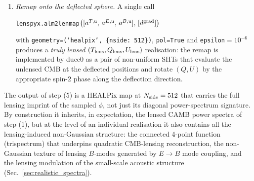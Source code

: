 \documentclass[11pt]{article}
\theoremstyle{definition}
\begin{document}
\begin{enumerate}[leftmargin=2.0em,itemsep=0.1em]
  \item \emph{Remap onto the deflected sphere.} A single call
  \begin{center}
    \texttt{lenspyx.alm2lenmap}$\bigl([a^{T,\rm u},\,a^{E,\rm u},\,a^{B,\rm u}],\,[d^{\rm grad}]\bigr)$
  \end{center}
  with \texttt{geometry=('healpix', \{nside: 512\})}, \texttt{pol=True} and \texttt{epsilon}$=10^{-6}$ produces a \emph{truly lensed} $(T_{\rm lens},Q_{\rm lens},U_{\rm lens})$ realisation: the remap is implemented by ducc0 as a pair of non-uniform SHTs that evaluate the unlensed CMB at the deflected positions and rotate $(Q,U)$ by the appropriate spin-2 phase along the deflection direction.
\end{enumerate}
The output of step (5) is a HEALPix map at $N_{\rm side}=512$ that carries the full lensing imprint of the sampled $\phi$, not just its diagonal power-spectrum signature. By construction it inherits, in expectation, the lensed CAMB power spectra of step (1), but at the level of an individual realisation it also contains all the lensing-induced non-Gaussian structure: the connected 4-point function (trispectrum) that underpins quadratic CMB-lensing reconstruction, the non-Gaussian texture of lensing $B$-modes generated by $E\!\to\!B$ mode coupling, and the lensing modulation of the small-scale acoustic structure (Sec.~\ref{sec:realistic_spectra}).
\end{document}
